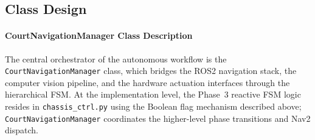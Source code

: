\subsection{Class Design}
\label{sec:class-design}

\paragraph{CourtNavigationManager Class Description}

The central orchestrator of the autonomous workflow is the \texttt{CourtNavigationManager} class, which bridges the ROS2 navigation stack, the computer vision pipeline, and the hardware actuation interfaces through the hierarchical FSM. At the implementation level, the Phase~3 reactive FSM logic resides in \texttt{chassis\_ctrl.py} using the Boolean flag mechanism described above; \texttt{CourtNavigationManager} coordinates the higher-level phase transitions and Nav2 dispatch.


